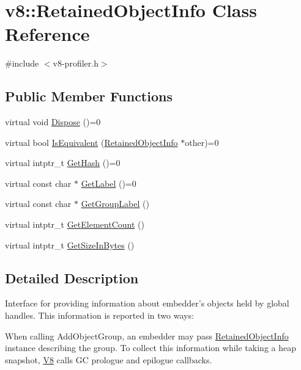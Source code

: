 \hypertarget{classv8_1_1RetainedObjectInfo}{\section{v8\-:\-:Retained\-Object\-Info Class Reference}
\label{classv8_1_1RetainedObjectInfo}
}


{\ttfamily \#include $<$v8-\/profiler.\-h$>$}

\subsection*{Public Member Functions}
\begin{DoxyCompactItemize}
\item 
virtual void \hyperlink{classv8_1_1RetainedObjectInfo_a5011203f7c5949049ba36b8059f03eca}{Dispose} ()=0
\item 
virtual bool \hyperlink{classv8_1_1RetainedObjectInfo_a286103bb076c85415919c86b1838c990}{Is\-Equivalent} (\hyperlink{classv8_1_1RetainedObjectInfo}{Retained\-Object\-Info} $\ast$other)=0
\item 
virtual intptr\-\_\-t \hyperlink{classv8_1_1RetainedObjectInfo_a6fdbfa242b95615e63f08433419c8066}{Get\-Hash} ()=0
\item 
virtual const char $\ast$ \hyperlink{classv8_1_1RetainedObjectInfo_ad19106fc7f0499fd45005077551d54c0}{Get\-Label} ()=0
\item 
virtual const char $\ast$ \hyperlink{classv8_1_1RetainedObjectInfo_adf835370c5516f2a89dd2d3f83dee10b}{Get\-Group\-Label} ()
\item 
virtual intptr\-\_\-t \hyperlink{classv8_1_1RetainedObjectInfo_ae6865597469bc7d28bd8ec71b4b890bd}{Get\-Element\-Count} ()
\item 
virtual intptr\-\_\-t \hyperlink{classv8_1_1RetainedObjectInfo_a1a899eed0b1f6e046edc3c7a7c08aa8c}{Get\-Size\-In\-Bytes} ()
\end{DoxyCompactItemize}


\subsection{Detailed Description}
Interface for providing information about embedder's objects held by global handles. This information is reported in two ways\-:


\begin{DoxyEnumerate}
\item When calling Add\-Object\-Group, an embedder may pass \hyperlink{classv8_1_1RetainedObjectInfo}{Retained\-Object\-Info} instance describing the group. To collect this information while taking a heap snapshot, \hyperlink{classv8_1_1V8}{V8} calls G\-C prologue and epilogue callbacks.
\end{DoxyEnumerate}


